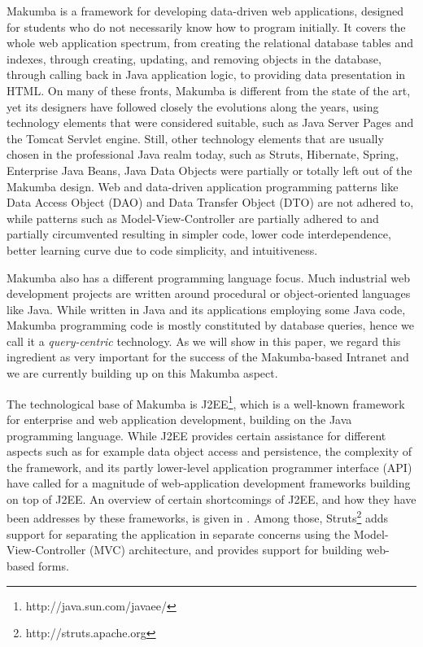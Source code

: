 \documentclass{chi2009}
\begin{document}
Makumba is a framework for developing data-driven web applications, designed for students who do not necessarily know how to program initially. It covers the whole  web application spectrum, from creating the relational database tables and indexes, through creating, updating, and removing objects in the database, through calling back in Java application logic, to providing data presentation in HTML. On many of these fronts, Makumba is different from the state of the art, yet its designers have followed closely the evolutions along the years, using technology elements that were considered suitable, such as Java Server Pages and the Tomcat Servlet engine. Still, other technology elements that are usually chosen in the professional Java realm today, such as Struts,
Hibernate, Spring, Enterprise Java Beans, Java Data Objects were partially or totally left out of the Makumba design. Web and data-driven application programming patterns like Data Access Object (DAO) and Data Transfer Object (DTO) are not adhered to, while patterns such as Model-View-Controller are partially adhered to and partially circumvented resulting in simpler code, lower code interdependence, better learning curve due to code simplicity, and intuitiveness. 

Makumba also has a different programming language focus. Much industrial web development projects are written around procedural or object-oriented languages like  Java. While written in Java and its applications employing some Java code, Makumba programming code is mostly constituted by database queries, hence we call it a \textit{query-centric} technology. As we will show in this paper, we regard this ingredient as very important for the success of the Makumba-based Intranet and we are currently building up on this Makumba aspect.

The technological base of Makumba is J2EE\footnote{http://java.sun.com/javaee/}, which is a well-known framework for enterprise and web application development, building on the Java programming language. While J2EE provides certain assistance for different aspects such as for example data object access and persistence, the complexity of the framework, and its partly lower-level application programmer interface (API) have called for a magnitude of web-application development frameworks building on top of J2EE. An overview of certain shortcomings of J2EE, and how they have been addresses by these frameworks, is given in \cite{johnson2005jdf}. Among those, Struts\footnote{http://struts.apache.org} adds support for separating the application in separate concerns using the Model-View-Controller (MVC) architecture, and provides support for building web-based forms. 
\end{document}
